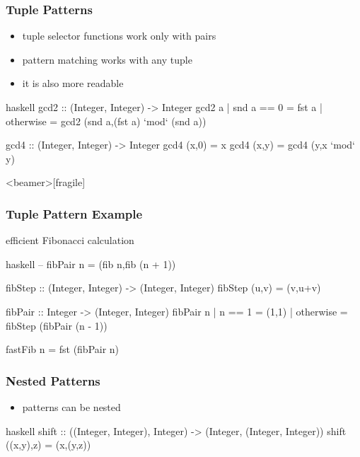 \documentclass[dvipsnames]{beamer}
\theoremstyle{plain}
\begin{document}
\begin{frame}[fragile]
  \frametitle{Tuple Patterns}

  \begin{itemize}
    \item tuple selector functions work only with pairs
    \item pattern matching works with any tuple
    \item it is also more readable
  \end{itemize}

  \begin{exampleblock}{}
    \begin{pygments}{haskell}
gcd2 :: (Integer, Integer) -> Integer
gcd2 a
  | snd a == 0 = fst a
  | otherwise  = gcd2 (snd a,(fst a) `mod` (snd a))

gcd4 :: (Integer, Integer) -> Integer
gcd4 (x,0) = x
gcd4 (x,y) = gcd4 (y,x `mod` y)
    \end{pygments}
  \end{exampleblock}
\end{frame}

\begin{frame}<beamer>[fragile]
  \frametitle{Tuple Pattern Example}

  \begin{exampleblock}{efficient Fibonacci calculation}
    \begin{pygments}{haskell}
-- fibPair n = (fib n,fib (n + 1))

fibStep :: (Integer, Integer) -> (Integer, Integer)
fibStep (u,v) = (v,u+v)

fibPair :: Integer -> (Integer, Integer)
fibPair n
  | n == 1    = (1,1)
  | otherwise = fibStep (fibPair (n - 1))

fastFib n = fst (fibPair n)
    \end{pygments}
  \end{exampleblock}
\end{frame}

\begin{frame}[fragile]
  \frametitle{Nested Patterns}

  \begin{itemize}
    \item patterns can be nested
  \end{itemize}

  \begin{exampleblock}{}
    \begin{pygments}{haskell}
shift :: ((Integer, Integer), Integer)
            -> (Integer, (Integer, Integer))
shift ((x,y),z) = (x,(y,z))
    \end{pygments}
  \end{exampleblock}
\end{frame}
\end{document}
